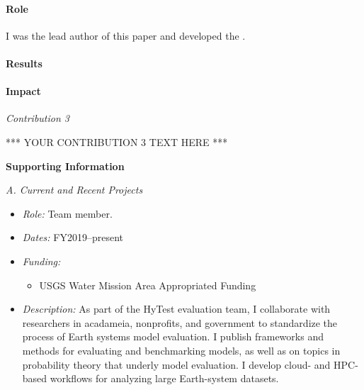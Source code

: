 \documentclass[12pt]{article}
\begin{document}
\paragraph{Role}
I was the lead author of this paper and developed the  .

\paragraph{Results} 

\paragraph{Impact} 



\vspace{10pt}
\raggedright \textit{Contribution 3} \\
\vspace{10pt}


*** YOUR CONTRIBUTION 3 TEXT HERE ***

\vspace{10pt}
\centering \textbf{Supporting Information} \\


\vspace{10pt}
\raggedright \large \textit{A. Current and Recent Projects} \\
\normalsize
\vspace{10pt}


\begin{itemize}
\item \textit{Role:} Team member.
\item \textit{Dates:} FY2019--present
\item \textit{Funding:}
  \vspace{-0.2cm}
  \begin{itemize}
    \item USGS Water Mission Area Appropriated Funding
  \end{itemize}
\item \textit{Description:}
  As part of the HyTest evaluation team, I collaborate with researchers in acadameia, nonprofits, and government to standardize the process of Earth systems model evaluation.
  I publish frameworks and methods for evaluating and benchmarking models,
  as well as on topics in probability theory that underly model evaluation.
  I develop cloud- and HPC-based workflows for analyzing large Earth-system datasets.
\end{itemize}
\end{document}
